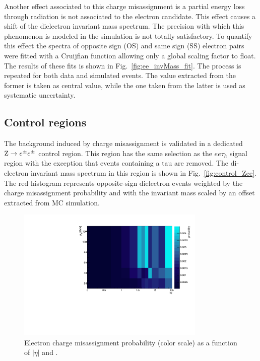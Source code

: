 Another effect associated to this charge misassignment is a partial energy loss through radiation is not associated to the electron candidate.
This effect causes a shift of the dielectron invariant mass spectrum.
The precision with which this phenomenon is modeled in the simulation is not totally satisfactory. To quantify this effect the spectra of opposite sign (OS) and same sign (SS) electron pairs were fitted with a Cruijfian function allowing only a global scaling factor to float. The results of these fits is shown in Fig.~\ref{fig:ee_invMass_fit}. The process is repeated for both data and simulated events. The value extracted from the former is taken as central value, while the one taken from the latter is used as systematic uncertainty.

\subsection{Control regions}

The background induced by charge misassignment is validated in a dedicated $\mathrm{Z} \rightarrow e^\pm e^\pm$ control region.
This region has the same selection as the $ee\tau_h$ signal region with the exception that events containing a tau are removed.
The di-electron invariant mass spectrum in this region is shown in Fig.~\ref{fig:control_Zee}. The red histogram represents opposite-sign dielectron events weighted by the charge misassignment probability and with the invariant mass scaled by an offset extracted from MC simulation.

\begin{figure}
  \begin{center}
  \includegraphics[width=0.8\textwidth]{4_Analisys/pics/8TeV/fakerate_fits/charge_flip_prob_map_eid12Medium_h2taucuts.pdf}
  \caption{
  Electron charge misassignment probability (color scale) as a function of $|\eta|$ and \pT.}
  \label{fig:charge_flip_prob_map}
  \end{center}
\end{figure}


